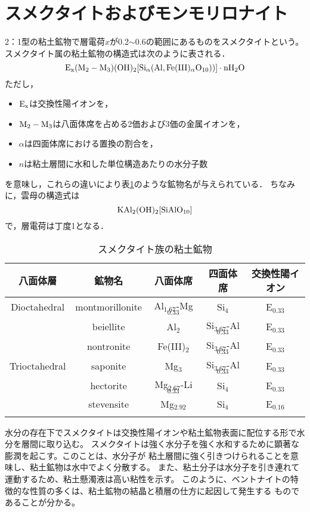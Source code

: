 \section{スメクタイトおよびモンモリロナイト}
2：1型の粘土鉱物で層電荷$x$が0.2$\sim$0.6の範囲にあるものをスメクタイトという。
スメクタイト属の粘土鉱物の構造式は次のように表される．
\[
	\rm 
	E_x(M_2-M_3)(OH)_2
	[ Si_\alpha (Al,Fe(III)_\alpha O_{10}))]
	\cdot nH_2O
\]
ただし，
\begin{itemize}
\item 
	$\rm E_x$は交換性陽イオンを，
\item
	$\rm M_2-M_3$は八面体席を占める2価および3価の金属イオンを，
\item
	$\alpha$は四面体席における置換の割合を，
\item
	$n$は粘土層間に水和した単位構造あたりの水分子数
\end{itemize}
を意味し，これらの違いにより表\ref{tbl:smectite}のような鉱物名が与えられている．
ちなみに，雲母の構造式は
\[
	\rm KAl_2(OH)_2[SiAlO_{10}]
\]
で，層電荷は丁度1となる．
\begin{table}[h]
\begin{center}
	\caption{スメクタイト族の粘土鉱物}
\begin{tabular}{c|c|c|c|c}
	\hline \hline 
	八面体層 & 鉱物名 & 八面体席 & 四面体席 & 交換性陽イオン \\
	\hline 
	Dioctahedral & montmorillonite & Al$_{1.67}$-Mg$_{0.33}$ & Si$_4$ & E$_{0.33}$ \\
		& beiellite & Al$_{2}$ & Si$_{3.67}$-Al$_{0.33}$ & E$_{0.33}$ \\
		& nontronite & Fe(III)$_{2}$ & Si$_{3.67}$-Al$_{0.33}$ & E$_{0.33}$ \\
	\hline
	Trioctahedral & saponite & Mg$_{3}$ & Si$_{3.67}$-Al$_{0.33}$ & E$_{0.33}$ \\
	 & hectorite & Mg$_{2.67}$-Li$_{0.33}$ & Si$_{4}$ & E$_{0.33}$ \\
	 & stevensite & Mg$_{2.92}$ & Si$_{4}$ & E$_{0.16}$ \\
\hline  \hline
	\label{tbl:smectite}
\end{tabular}
\end{center}
\end{table}


水分の存在下でスメクタイトは交換性陽イオンや粘土鉱物表面に配位する形で水分を層間に取り込む。
スメクタイトは強く水分子を強く水和するために顕著な膨潤を起こす。このことは、水分子が
粘土層間に強く引きつけられることを意味し、粘土鉱物は水中でよく分散する。
また、粘土分子は水分子を引き連れて運動するため、粘土懸濁液は高い粘性を示す。
このように、ベントナイトの特徴的な性質の多くは、粘土鉱物の結晶と積層の仕方に起因して発生する
ものであることが分かる。


